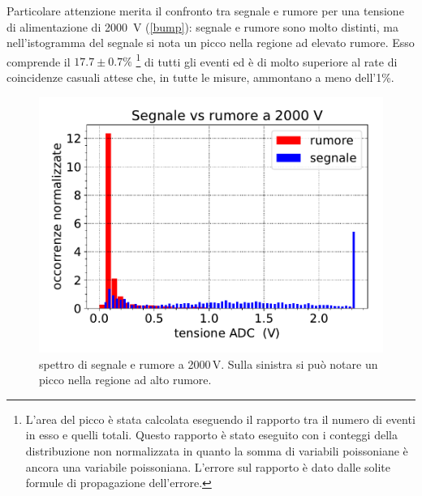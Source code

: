 Particolare attenzione merita il confronto tra segnale e rumore per una tensione di alimentazione di \SI{2000}{V} (\autoref{bump}): segnale e rumore sono molto distinti, ma nell'istogramma del segnale si nota un picco nella regione ad elevato rumore.
Esso comprende il $17.7\pm0.7\%$%
\footnote{L'area del picco è stata calcolata eseguendo il rapporto tra il numero di eventi in esso e quelli totali. Questo rapporto è stato eseguito con i conteggi della distribuzione non normalizzata in quanto la somma di variabili poissoniane è ancora una variabile poissoniana. L'errore sul rapporto è dato dalle solite formule di propagazione dell'errore.}
di tutti gli eventi ed è di molto superiore al rate di coincidenze casuali attese che, in tutte le misure, ammontano a meno dell'1\%.

\begin{figure}[h]
\centering
\includegraphics[width=10 cm]{2000}
\caption{spettro di segnale e rumore a 2000\,V. Sulla sinistra si può notare un picco nella regione ad alto rumore.}
\label{bump}
\end{figure}
